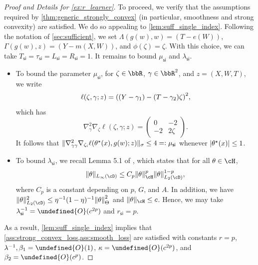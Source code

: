 \documentclass[11pt]{article} %
\newcommand{\pref}[1]{\cref{#1}}
\theoremstyle{theorem}  %
\theoremstyle{plain}
\DeclarePairedDelimiter{\abs}{\lvert}{\rvert} %
\DeclarePairedDelimiter{\prn}{(}{)}
\DeclarePairedDelimiter{\nrm}{\|}{\|}
\newcommand{\ls}{\ell}
\newcommand{\rdef}{=\vcentcolon}
\newcommand{\wt}[1]{\widetilde{#1}}
\let\wt\undefined
\newcommand{\wt}[1]{\widetilde{#1}}
\newcommand{\grad}{\nabla}
\newcommand{\Ot}{\wt{O}}
\newcommand{\bigoht}{\Ot}
\newcommand{\varone}{w} %
\newcommand{\vartwo}{x} %
\newcommand{\besttwo}{\theta^{\star}}
\newcommand{\si}{\mathsf{si}}
\newcommand{\Lsi}{L_{\si}}
\newcommand{\Rsi}{R_{\si}}
\newcommand{\Tsi}{T_{\si}}
\newcommand{\tausi}{\tau_{\si}}
\newcommand{\musi}{\mu_{\si}}
\newcommand{\gammasi}{\lambda_{\si}}
\newcommand{\lambdasi}{\gammasi}
\newcommand{\rsi}{r_{\si}}
\begin{document}
\begin{proof}[Proof and Details for \pref{ex:r_learner}]
To proceed, we verify that the assumptions required by \pref{thm:generic_strongly_convex} (in particular, smoothness and strong convexity) are satisfied. We do so appealing to \pref{lem:suff_single_index}. Following the notation of \pref{sec:sufficient}, we set $\Lambda(g(w),w)=(T-e(W))$, $\Gamma(g(w),z) = (Y-m(X,W))$, and $\phi(\zeta)=\zeta$. With this choice, we can take $\Tsi=\tausi=\Lsi=\Rsi=1$. It remains to bound $\musi$ and $\gammasi$.
\begin{itemize}
  \item To bound the parameter $\musi$, for $\zeta\in\bbR$, $\gamma\in\bbR^2$, and $z=(X,W,T)$, we write
  \[
    \ls(\zeta,\gamma;z) = \prn*{(Y-\gamma_1) - (T-\gamma_2)\zeta}^2,
  \]
  which has
  \[
    \grad^2_{\gamma}\grad_{\zeta}\ls(\zeta,\gamma;z) = \left(
      \begin{array}{lr}
        0 & -2\\
        -2 & 2\zeta
      \end{array}
      \right).
    \]
    It follows that $\nrm{\nabla_{\gamma\gamma}^2 \nabla_{\zeta_i} \ell(\besttwo(\vartwo), g(\varone);z)}_{\sigma}\leq{}4\rdef\musi$ whenever $\abs{\besttwo(x)}\leq{}1$.
  \item To bound $\lambdasi$, we recall Lemma 5.1 of \cite{mendelson2010regularization}, which states that for all $\theta\in\cH$,
\[
  \nrm{\theta}_{L_{\infty}(\cD)}\leq{} C_{p}\nrm{\theta}_{\cH}^{p}  \nrm{\theta}_{L_{2}(\cD)}^{1-p},
\]
where $C_p$ is a constant depending on $p$, $G$, and $A$. In addition, we have $\nrm{\theta}_{L_{2}(\cD)}^2\leq{}\eta^{-1}(1-\eta)^{-1}\nrm*{\theta}_{\Theta}^2$ and $\nrm{\theta}_{\cH}\leq{}c$. Hence, we may take $\lambdasi^{-1}=\bigoht(c^{2p})$ and $\rsi=p$.
  \end{itemize}
  As a result, \pref{lem:suff_single_index} implies that \pref{ass:strong_convex_loss,ass:smooth_loss} are satisfied with constants $r=p$, $\lambda^{-1},\beta_1=\bigoht(1)$, $\kappa=\bigoht(c^{2p})$, and $\beta_2=\bigoht(c^p)$.
%
%
%
%

\end{proof}
\end{document}

